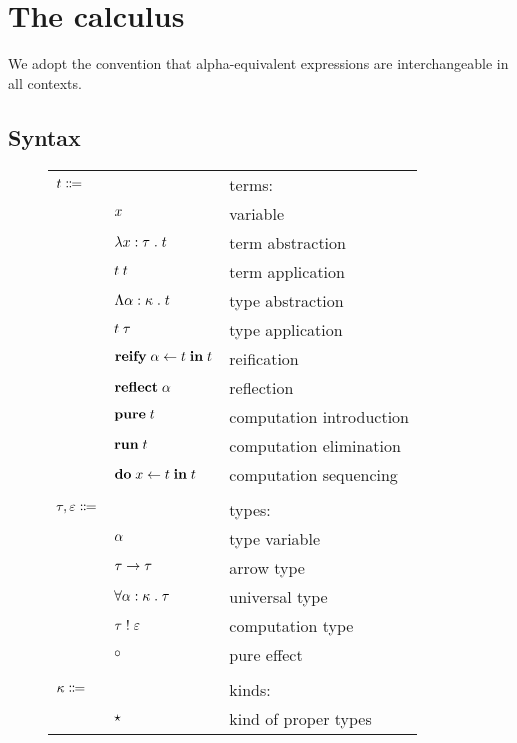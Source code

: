 \section{The calculus}

  We adopt the convention that alpha-equivalent expressions are interchangeable in all contexts.

  \subsection{Syntax}

    \begin{figure}[H]
      \begin{center}
        \begin{tabular}{l l l}
          $t \Coloneqq$ & & terms: \\
          & $x$ & variable \\
          & $\lambda x : \tau \; . \; t$ & term abstraction \\
          & $t \; t$ & term application \\
          & $\Lambda \alpha : \kappa \; . \; t$ & type abstraction \\
          & $t \; \tau$ & type application \\
          & $\mathbf{reify} \; \alpha \leftarrow t \; \mathbf{in} \; t$ & reification \\
          & $\mathbf{reflect} \; \alpha$ & reflection \\
          & $\mathbf{pure} \; t$ & computation introduction \\
          & $\mathbf{run} \; t$ & computation elimination \\
          & $\mathbf{do} \; x \leftarrow t \; \mathbf{in} \; t$ & computation sequencing \\
          \\
          $\tau, \varepsilon \Coloneqq$ & & types: \\
          & $\alpha$ & type variable \\
          & $\tau \rightarrow \tau$ & arrow type \\
          & $\forall \alpha : \kappa \; . \; \tau$ & universal type \\
          & $\tau \; ! \; \varepsilon$ & computation type \\
          & $\circ$ & pure effect \\
          \\
          $\kappa \Coloneqq$ & & kinds: \\
          & $\star$ & kind of proper types \\

\end{tabular}
\end{center}
\end{figure}
